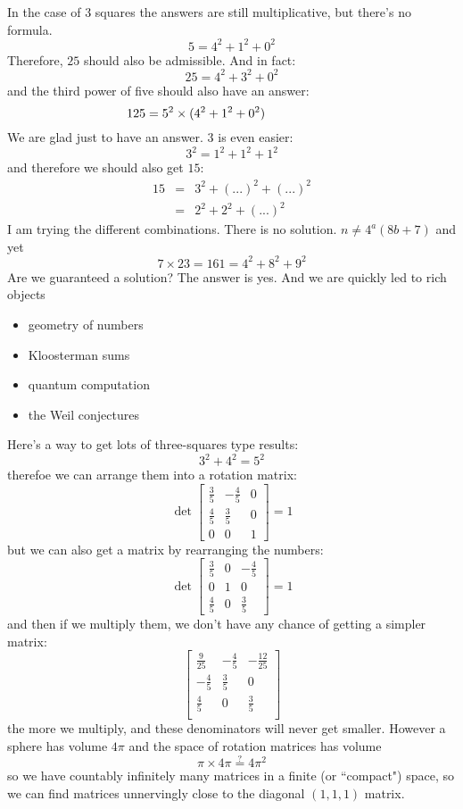 \documentclass[12pt]{article}
\begin{document}
\newpage

In the case of 3 squares the answers are still multiplicative, but there's no formula.  
$$ 5 = 4^2 + 1^2 + 0^2 $$
Therefore, $25$ should also be admissible.  And in fact:
$$ 25 = 4^2 + 3^2 + 0^2 $$
and the third power of five should also have an answer:
$$ \hspace{-0.8in} 125 = 5^2 \times ( 4^2 + 1^2 + 0^2 ) $$
We are glad just to have an answer.  3 is even easier:
$$ 3^2 = 1^2 + 1^2 + 1^2 $$
and therefore we should also get $15$:
\begin{eqnarray*} 15 &=& 3^2 + (...)^2 + (...)^2  \\
&=& 2^2  + 2^2 + (...)^2
\end{eqnarray*}
I am trying the different combinations.  There is no solution.  $n \neq 4^a(8b+7) $ and yet 
$$ 7 \times 23 = 161 = 4^2 + 8^2 + 9^2 $$
Are we guaranteed a solution?  The answer is yes.  And we are quickly led to rich objects
\begin{itemize}
\item geometry of numbers
\item Kloosterman sums
\item quantum computation
\item the Weil conjectures 
\end{itemize}

\newpage

\noindent Here's a way to get lots of three-squares type results:
$$ 3^2 + 4^2 = 5^2$$
therefoe we can arrange them into a rotation matrix:
$$ \det \left[ 
\begin{array}{crc}
\frac{3}{5} & -\frac{4}{5} & 0 \\
\frac{4}{5} & \frac{3}{5} & 0 \\
0 & 0 & 1  \end{array}\right] = 1$$
but we can also get a matrix by rearranging the numbers:
$$ \det \left[ 
\begin{array}{ccr}
\frac{3}{5} & 0 &  -\frac{4}{5}  \\
0 & 1 & 0 \\
\frac{4}{5} & 0  & \frac{3}{5}  
  \end{array}\right] = 1$$
and then if we multiply them, we don't have any chance of getting a simpler matrix:
$$ \left[
\begin{array}{rrr}
\frac{9}{25} & - \frac{4}{5} & - \frac{12}{25} \\
-\frac{4}{5} & \frac{3}{5} & 0 \\ 
\frac{4}{5} & 0 & \frac{3}{5} \\ 
\end{array}\right]
$$
the more we multiply, and these denominators will never get smaller.  However a sphere has volume $4\pi$ and the space of rotation matrices has volume 
$$\pi \times 4\pi \stackrel{?}{=} 4\pi^2 $$
so we have countably infinitely many matrices in a finite (or ``compact") space, so we can find matrices unnervingly close to the diagonal $(1,1,1)$ matrix.
\end{document}
